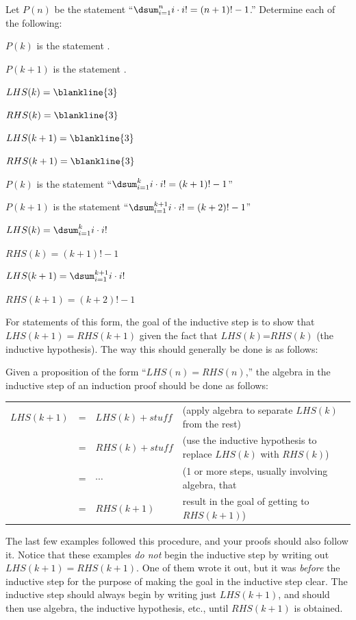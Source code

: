 \begin{ques}
Let $P(n)$ be the statement 
``$\dsum_{i=1}^{n} i\cdot i! = (n+1)!-1$.''
Determine each of the following:
\begin{lenum}
\item $P(k)$ is the statement .
\item $P(k+1)$ is the statement .
\item $LHS(k)=\blankline{3}$
\item $RHS(k)=\blankline{3}$
\item $LHS(k+1)=\blankline{3}$
\item $RHS(k+1)=\blankline{3}$
\end{lenum}
\begin{answer}
\begin{lenum}
\item $P(k)$ is the statement ``$\dsum_{i=1}^{k} i\cdot i! = (k+1)!-1$''
\item $P(k+1)$ is the statement ``$\dsum_{i=1}^{k+1} i\cdot i! = (k+2)!-1$''
\item $LHS(k)=\dsum_{i=1}^{k} i\cdot i!$
\item $RHS(k)=(k+1)!-1$
\item $LHS(k+1)=\dsum_{i=1}^{k+1} i\cdot i!$
\item $RHS(k+1)=(k+2)!-1$
\end{lenum}
\end{answer}
\end{ques}

For statements of this form, the goal of the inductive step is to show that 
$LHS(k+1)=RHS(k+1)$ given the fact that $LHS(k)$=$RHS(k)$ (the inductive hypothesis). 
The way this should generally be done is as follows:
\begin{proc}
Given a proposition of the form ``$LHS(n)=RHS(n)$,'' the algebra in the
inductive step of an induction proof should be done as follows:

\medskip
\noindent
\begin{tabular}{lllp{3.4in}}
$LHS(k+1)$&=&$LHS(k)+stuff$&(apply algebra to separate $LHS(k)$ from the rest)\\
        &=&$RHS(k)+stuff$&(use the inductive hypothesis to replace $LHS(k)$ with $RHS(k)$)\\
        &=&$\cdots$&(1 or more steps, usually involving algebra, that\\
        &=&$RHS(k+1)$&result in the goal of getting to $RHS(k+1)$)
\end{tabular}
\end{proc}
The last few examples followed this procedure, and your proofs should also follow it.
Notice that these examples {\em do not} begin the inductive step by writing out $LHS(k+1)=RHS(k+1)$.
One of them wrote it out, but it was {\em before} the inductive step for the purpose of
making the goal in the inductive step clear. 
The inductive step should always begin by writing just 
$LHS(k+1)$, and should then use algebra, the inductive hypothesis, etc., 
until $RHS(k+1)$ is obtained. 


